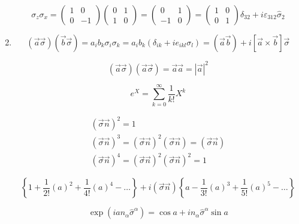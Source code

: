\begin{solution}
\begin{enumerate}
	$$
	\sigma_{z} \sigma_{x}=\left(\begin{array}{ll}{1} & {0} \\ {0} & {-1}\end{array}\right)\left(\begin{array}{ll}{0} & {1} \\ {1} & {0}\end{array}\right)=\left(\begin{array}{ll}{0} & {1} \\ {-1} & {0}\end{array}\right)=\left(\begin{array}{ll}{1} & {0} \\ {0} & {1}\end{array}\right) \delta_{32}+i \varepsilon_{312} \hat{\sigma}_{2}
	$$
	
	

\item 

$$
(\vec{a} \vec{\sigma})(\vec{b} \vec{\sigma})=a_{i} b_{k} \sigma_{i} \sigma_{k}=a_{i} b_{k}\left(\delta_{i k}+i e_{i k l} \sigma_{l}\right)=(\vec{a} \vec{b})+i[\vec{a} \times \vec{b}] \vec{\sigma}
$$

$$
(\vec{a} \vec{\sigma})(\vec{a} \vec{\sigma})=\vec{a} \vec{a}=|\vec{a}|^{2}
$$

$$
e^{X}=\sum_{k=0}^{\infty} \frac{1}{k !} X^{k}
$$

$$
\begin{array}{l}{(\vec{\sigma} \vec{n})^{2}=1} \\ {(\vec{\sigma} \vec{n})^{3}=(\vec{\sigma} \vec{n})^{2}(\vec{\sigma} \vec{n})=(\vec{\sigma} \vec{n})} \\ {(\vec{\sigma} \vec{n})^{4}=(\vec{\sigma} \vec{n})^{2}(\vec{\sigma} \vec{n})^{2}=1}\end{array}
$$

$$
\left\{1+\frac{1}{2 !}\left(a\right)^{2}+\frac{1}{4 !}\left(a\right)^{4}-\ldots\right\}+i(\vec{\sigma} \vec{n})\left\{a-\frac{1}{3 !}\left(a\right)^{3}+\frac{1}{5 !}\left(a\right)^{5}-\ldots\right\}
$$

$$
\exp \left(i a n_{\alpha} \hat{\sigma}^{\alpha}\right)=\cos a+i n_{\alpha} \hat{\sigma}^{\alpha} \sin a
$$

\end{enumerate}

\end{solution}

